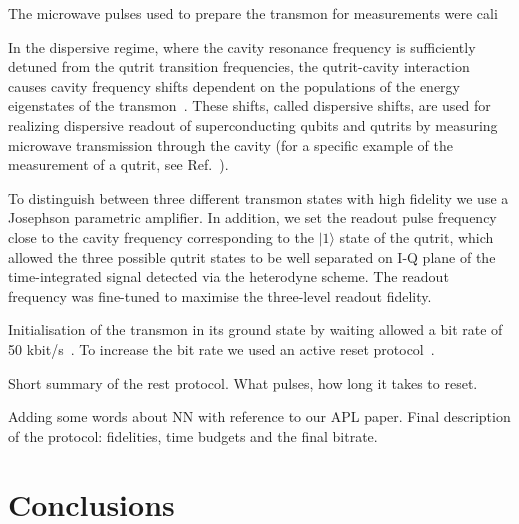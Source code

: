 \documentclass[11pt,a4paper]{article}
\begin{document}
The microwave pulses used to prepare the transmon for measurements were cali

In the dispersive regime, where the cavity resonance frequency is sufficiently detuned from the qutrit transition frequencies, the qutrit-cavity interaction causes cavity frequency shifts dependent on the populations of the energy eigenstates of the transmon~\cite{Koch2007}. These shifts, called dispersive shifts, are used for realizing dispersive readout of superconducting qubits and qutrits by measuring microwave transmission through the cavity (for a specific example of the measurement of a qutrit, see Ref.~\cite{Bianchetti2010,Jerger2016}).

To distinguish between three different transmon states with high fidelity we use a Josephson parametric amplifier. In addition, we set the readout pulse frequency close to the cavity frequency corresponding to the $|1\rangle$ state of the qutrit, which allowed the three possible qutrit states to be well separated on I-Q plane of the time-integrated signal detected via the heterodyne scheme. The readout frequency was fine-tuned to maximise the three-level readout fidelity.

Initialisation of the transmon in its ground state by waiting allowed a bit rate of  50 kbit/s~\cite{PhysRevLett.119.240501}. To increase the bit rate we used an active reset protocol~\cite{Jerger2015,Magnard2018}.

Short summary of the rest protocol. What pulses, how long it takes to reset.

Adding some words about NN with reference to our APL paper. Final description of the protocol: fidelities, time budgets and the final bitrate.



\section{Conclusions}


\end{document}
